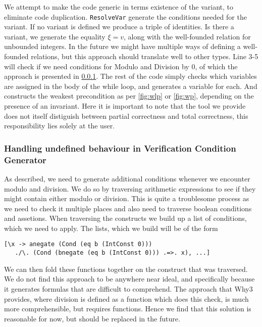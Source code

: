 We attempt to make the code generic in terms existence of the variant, to eliminate code duplication.
\texttt{ResolveVar} generate the conditions needed for the variant.
If no variant is defined we produce a triple of identities.
Is there a variant, we generate the equality $\xi = v$, along with the well-founded relation for unbounded integers.
In the future we might have multiple ways of defining a well-founded relations, but this approach should translate well to other types.
Line 3-5 will check if we need conditions for Modulo and Division by 0, of which the approach is presented in \cref{sec:undef}. The rest of the code simply checks which variables are assigned in the body of the while loop, and generates a variable for each. And constructs the weakest precondition as per \cref{fig:wlp} or \cref{fig:wp}, depending on the presence of an invariant. Here it is important to note that the tool we provide does not itself distiguish between partial correctness and total correctness, this responsibility lies solely at the user.

\subsubsection{Handling undefined behaviour in Verification Condition Generator}\label{sec:undef}
As described, we need to generate additional conditions whenever we encounter modulo and division. We do so by traversing arithmetic expressions to see if they might contain either modulo or division. This is quite a troublesome process as we need to check it multiple places and also need to traverse boolean conditions and assetions. When traversing the constructs we build up a list of conditions, which we need to apply. The lists, which we build will be of the form
\begin{lstlisting}
[\x -> anegate (Cond (eq b (IntConst 0)))
   ./\. (Cond (bnegate (eq b (IntConst 0))) .=>. x), ...]
\end{lstlisting}
We can then fold these functions together on the construct that was traversed.
We do not find this approach to be anywhere near ideal, and specifically because it generates formulas that are difficult to comprehend.
The approach that Why3 provides, where division is defined as a function which does this check, is much more comprehensible, but requires functions. Hence we find that this solution is reasonable for now, but should be replaced in the future.
